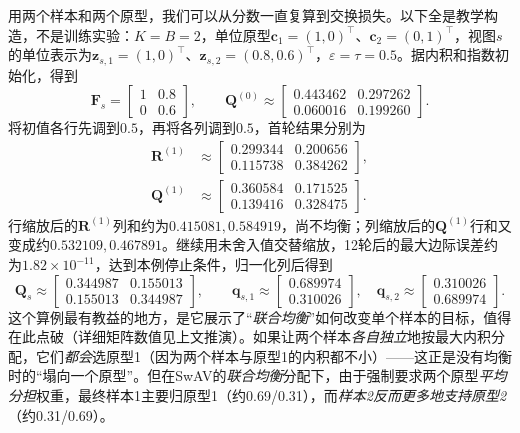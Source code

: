 用两个样本和两个原型，我们可以从分数一直复算到交换损失。以下全是教学构造，不是训练实验：$K=B=2$，单位原型$\bm{c}_1=(1,0)^{\top}$、$\bm{c}_2=(0,1)^{\top}$，视图$s$的单位表示为$\bm{z}_{s,1}=(1,0)^{\top}$、$\bm{z}_{s,2}=(0.8,0.6)^{\top}$，$\varepsilon=\tau=0.5$。据内积和指数初始化，得到
\[
  \bm{F}_s=\begin{bmatrix}1&0.8\\0&0.6\end{bmatrix},
  \qquad
  \bm{Q}^{(0)}\approx
  \begin{bmatrix}0.443462&0.297262\\0.060016&0.199260\end{bmatrix}.
\]
将初值各行先调到$0.5$，再将各列调到$0.5$，首轮结果分别为
\[
  \begin{aligned}
    \bm{R}^{(1)}&\approx
    \begin{bmatrix}0.299344&0.200656\\0.115738&0.384262\end{bmatrix},\\
    \bm{Q}^{(1)}&\approx
    \begin{bmatrix}0.360584&0.171525\\0.139416&0.328475\end{bmatrix}.
  \end{aligned}
\]
行缩放后的$\bm{R}^{(1)}$列和约为$0.415081,0.584919$，尚不均衡；列缩放后的$\bm{Q}^{(1)}$行和又变成约$0.532109,0.467891$。继续用未舍入值交替缩放，12轮后的最大边际误差约为$1.82\times10^{-11}$，达到本例停止条件，归一化列后得到
\[
  \bm{Q}_s\approx
  \begin{bmatrix}0.344987&0.155013\\0.155013&0.344987\end{bmatrix},
  \qquad
  \bm{q}_{s,1}\approx\begin{bmatrix}0.689974\\0.310026\end{bmatrix},
  \quad
  \bm{q}_{s,2}\approx\begin{bmatrix}0.310026\\0.689974\end{bmatrix}.
\]
这个算例最有教益的地方，是它展示了“\emph{联合均衡}”如何改变单个样本的目标，值得在此点破（详细矩阵数值见上文推演）。如果让两个样本\emph{各自独立}地按最大内积分配，它们\emph{都会}选原型1（因为两个样本与原型1的内积都不小）——这正是没有均衡时的“塌向一个原型”。但在SwAV的\emph{联合均衡}分配下，由于强制要求两个原型\emph{平均分担}权重，最终样本1主要归原型1（约0.69/0.31），而\emph{样本2反而更多地支持原型2}（约0.31/0.69）。


